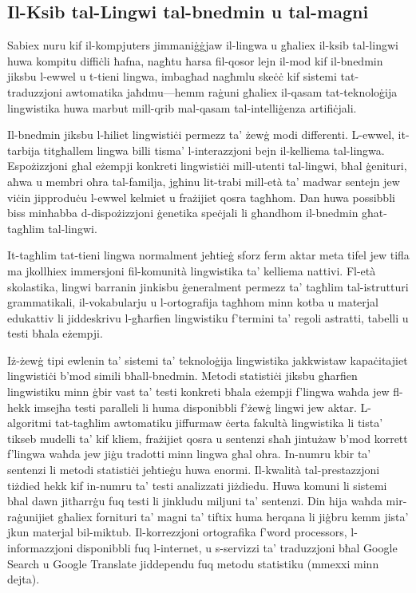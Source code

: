 \documentclass[]{../../metanetpaper}
\begin{document}
\begin{multicols}{2}
\subsection{Il-Ksib tal-Lingwi tal-bnedmin u tal-magni}

Sabiex nuru kif il-kompjuters jimmaniġġjaw il-lingwa u għaliex il-ksib tal-lingwi huwa kompitu diffiċli ħafna, nagħtu ħarsa fil-qosor lejn il-mod kif il-bnedmin jiksbu l-ewwel u t-tieni lingwa, imbagħad nagħmlu skeċċ kif sistemi tat-traduzzjoni awtomatika jaħdmu—hemm raġuni għaliex il-qasam tat-teknoloġija lingwistika huwa marbut mill-qrib mal-qasam tal-intelliġenza artifiċjali.
   
Il-bnedmin jiksbu l-ħiliet lingwistiċi permezz ta’ żewġ modi differenti. L-ewwel, it-tarbija titgħallem lingwa billi tisma’ l-interazzjoni bejn il-kelliema tal-lingwa. Espożizzjoni għal eżempji konkreti lingwistiċi mill-utenti tal-lingwi, bħal ġenituri, aħwa u membri oħra tal-familja, jgħinu lit-trabi mill-età ta’ madwar sentejn jew viċin jipproduċu l-ewwel kelmiet u frażijiet qosra tagħhom. Dan huwa possibbli biss minħabba d-dispożizzjoni ġenetika speċjali li għandhom il-bnedmin għat-tagħlim tal-lingwi.
   
It-tagħlim tat-tieni lingwa normalment jeħtieġ sforz ferm aktar meta tifel jew tifla ma jkollhiex immersjoni fil-komunità lingwistika ta’ kelliema nattivi. Fl-età skolastika, lingwi barranin jinkisbu ġeneralment permezz ta’ tagħlim tal-istrutturi grammatikali, il-vokabularju u l-ortografija tagħhom minn kotba u materjal edukattiv li jiddeskrivu l-għarfien lingwistiku f'termini ta' regoli astratti, tabelli u testi bħala eżempji. 
   
Iż-żewġ tipi ewlenin ta’ sistemi ta’ teknoloġija lingwistika jakkwistaw kapaċitajiet lingwistiċi b’mod simili bħall-bnedmin. Metodi statistiċi jiksbu għarfien lingwistiku minn ġbir vast ta’ testi konkreti bħala eżempji f'lingwa waħda jew fl-hekk imsejħa testi paralleli li huma disponibbli f’żewġ lingwi jew aktar. L-algoritmi tat-tagħlim awtomatiku jiffurmaw ċerta  fakultà lingwistika li tista’ tikseb mudelli ta’ kif kliem, frażijiet qosra u sentenzi sħaħ jintużaw b’mod korrett f'lingwa waħda jew jiġu tradotti minn lingwa għal oħra. In-numru kbir ta’ sentenzi li metodi statistiċi jeħtieġu huwa enormi. Il-kwalità tal-prestazzjoni tiżdied hekk kif in-numru ta’ testi analizzati jiżdiedu. Huwa komuni li sistemi bħal dawn jitħarrġu fuq testi li jinkludu miljuni ta’ sentenzi. Din hija waħda mir-raġunijiet għaliex fornituri ta’ magni ta’ tiftix huma ħerqana li jiġbru kemm jista’ jkun materjal bil-miktub. Il-korrezzjoni ortografika f’word processors, l-informazzjoni disponibbli fuq l-internet, u s-servizzi ta’ traduzzjoni bħal Google Search u Google Translate jiddependu fuq metodu statistiku (mmexxi minn dejta).
   

\end{multicols}
\end{document}
